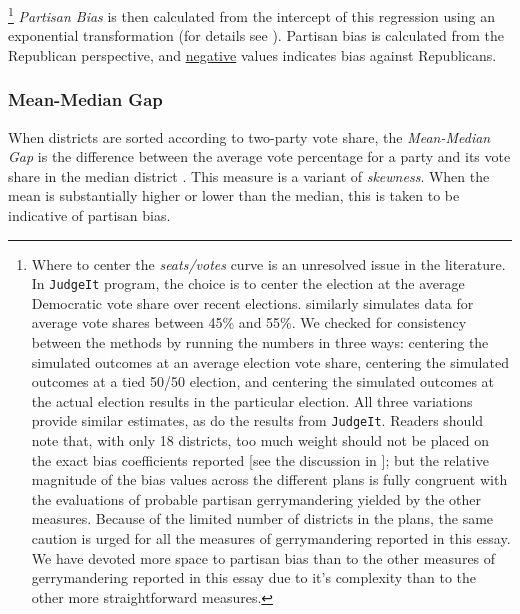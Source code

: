         \footnote{Where to center the \textit{seats/votes} curve is an unresolved issue in the literature. In \citet{GelmanKing1994_unifiedAJPS} \texttt{JudgeIt} program, the choice is to center the election at the average Democratic vote share over recent elections. \citet{Kastellec_et_al_2008_PS} similarly simulates data for average vote shares between 45\% and 55\%. We checked for consistency between the methods by running the numbers in three ways: centering the simulated outcomes at an average election vote share, centering the simulated outcomes at a tied 50/50 election, and centering the simulated outcomes at the actual election results in the particular election. All three variations provide similar estimates, as do the results from \texttt{JudgeIt}. Readers should note that, with only 18 districts, too much weight should not be placed on the exact bias coefficients reported [see the discussion in \citet{Browning_King_1987_seats_votes}]; but the relative magnitude of the bias values across the different plans is fully congruent with the evaluations of probable partisan gerrymandering yielded by the other measures. Because of the limited number of districts in the plans, the same caution is urged for all the measures of gerrymandering reported in this essay. We have devoted more space to partisan bias than to the other measures of gerrymandering reported in this essay due to it's complexity than to the other more straightforward measures.} 
    \textit{Partisan Bias} is then calculated from the intercept of this regression using an exponential transformation (for details see \citet{Grofman1983}). Partisan bias is calculated from the Republican perspective, and \underline{negative} values indicates bias against Republicans.
\par
            \subsubsection*{Mean-Median Gap}
    When districts are sorted according to two-party vote share, the \textit{Mean-Median Gap} is the difference between the average vote percentage for a party and its vote share in the median district \citep[see][]{Best2018}. This measure is a variant of \textit{skewness}. When the mean is substantially higher or lower than the median, this is taken to be indicative of partisan bias.
\par

